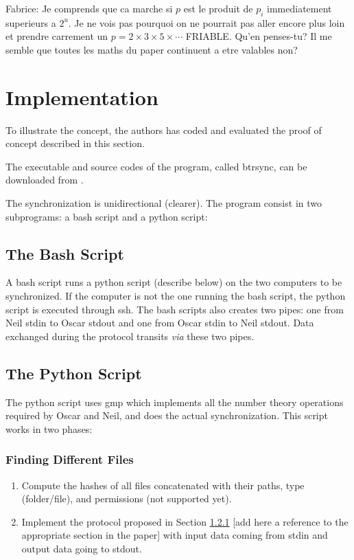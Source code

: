 \documentclass[11pt]{llncs}
\begin{document}
Fabrice: Je comprends que ca marche si $p$ est le produit de $p_i$ immediatement superieurs a $2^u$. Je ne vois pas pourquoi on ne pourrait pas aller encore plus loin et prendre carrement un $p=2\times 3\times 5\times \cdots$ FRIABLE. Qu'en penses-tu? Il me semble que toutes les maths du paper continuent a etre valables non?

\section{Implementation}
\label{program}

To illustrate the concept, the authors has coded and evaluated the proof of concept described in this section.\smallskip

The executable and source codes of the program, called {\sf btrsync}, can be downloaded from \cite{Robin}.\smallskip

The synchronization is unidirectional (clearer). The program consist in two subprograms: a bash script and a python script:

\subsection{The Bash Script}

A bash script runs a python script (describe below) on the two computers to be synchronized. If the computer is not the one running the bash script, the python script is executed through ssh. The bash scripts also creates two pipes: one from Neil stdin to Oscar stdout and one from Oscar stdin to Neil stdout. Data exchanged during the protocol transits {\sl via} these two pipes.

\subsection{The Python Script}

The python script uses gmp which implements all the number theory operations required by Oscar and Neil, and does the actual synchronization. This script works in two phases:

\subsubsection{Finding Different Files}

\begin{enumerate}
\item Compute the hashes of all files concatenated with their paths, type (folder/file), and permissions (not supported yet).
\item Implement the protocol proposed in Section \ref{} [add here a reference to the appropriate section in the paper] with input data coming from stdin and output data going to stdout.
\end{enumerate}
\end{document}

